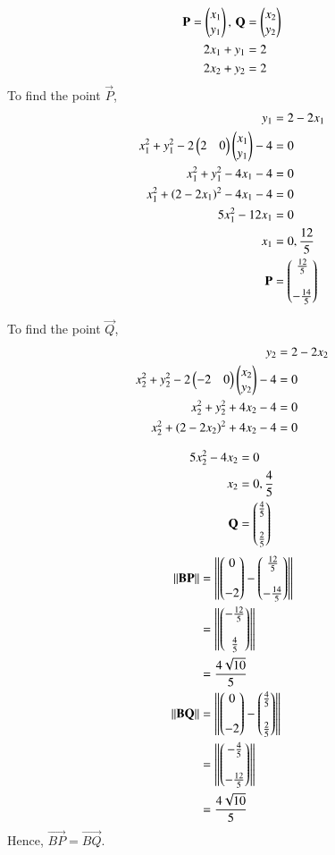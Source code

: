 \documentclass[journal,12pt,twocolumn]{IEEEtran}
\begin{document}
\begin{enumerate}
\begin{align}
\mathbf{P} = \begin{pmatrix}x_1\\y_1\end{pmatrix}, \, \mathbf{Q} &= \begin{pmatrix}x_2\\y_2\end{pmatrix}\\
2x_1 + y_1 &= 2\\
2x_2 + y_2 &= 2
\end{align}
To find the point $\vec{P}$,
\begin{align}
y_1 &= 2 - 2x_1\\
x_1^2 + y_1^2 - 2\begin{pmatrix}2&0\end{pmatrix}\begin{pmatrix}x_1\\y_1\end{pmatrix}-4 &= 0\\
x_1^2 + y_1^2 - 4 x_1-4 &= 0\\
x_1^2 + \left(2-2x_1\right)^2 -4x_1 -4 &= 0\\
5x_1^2 - 12x_1 &= 0\\
x_1 &= 0, \frac{12}{5}\\
\mathbf{P} &= \begin{pmatrix}\frac{12}{5}\\\\-\frac{14}{5}\end{pmatrix}
\end{align}

To find the point $\vec{Q}$,
\begin{align}
y_2 &= 2 - 2x_2\\
x_2^2 + y_2^2 - 2\begin{pmatrix}-2&0\end{pmatrix}\begin{pmatrix}x_2\\y_2\end{pmatrix}-4 &= 0\\
x_2^2 + y_2^2 +4 x_2-4 &= 0\\
x_2^2 + \left(2-2x_2\right)^2 +4x_2 -4 &= 0
\end{align}

\begin{align}
5x_2^2 -4x_2&= 0\\
x_2 &= 0,\frac{4}{5}\\
\mathbf{Q} &= \begin{pmatrix}\frac{4}{5}\\\\\frac{2}{5}\end{pmatrix}
\end{align}
\begin{align}
\left\lVert\mathbf{BP}\right\rVert &= \left\lVert\begin{pmatrix}0\\\\-2\end{pmatrix} - \begin{pmatrix}\frac{12}{5}\\\\-\frac{14}{5}\end{pmatrix}\right\rVert\\
&= \left\lVert\begin{pmatrix}-\frac{12}{5}\\\\\frac{4}{5}\end{pmatrix}\right\rVert\\
&= \frac{4\sqrt{10}}{5}\\
\left\lVert\mathbf{BQ}\right\rVert &= \left\lVert\begin{pmatrix}0\\\\-2\end{pmatrix} - \begin{pmatrix}\frac{4}{5}\\\\\frac{2}{5}\end{pmatrix}\right\rVert\\
&= \left\lVert\begin{pmatrix}-\frac{4}{5}\\\\-\frac{12}{5}\end{pmatrix}\right\rVert\\
&= \frac{4\sqrt{10}}{5}
\end{align}
Hence, $\vec{BP} = \vec{BQ}$.
\end{enumerate}
\end{document}
